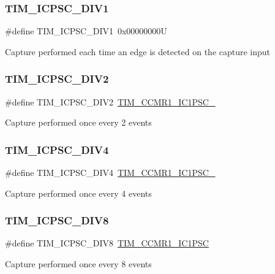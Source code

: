 \subsubsection{\texorpdfstring{TIM\_ICPSC\_DIV1}{TIM\_ICPSC\_DIV1}}
{\footnotesize\ttfamily \#define T\+I\+M\+\_\+\+I\+C\+P\+S\+C\+\_\+\+D\+I\+V1~0x00000000U}

Capture performed each time an edge is detected on the capture input \mbox{\label{group___t_i_m___input___capture___prescaler_ga1d8a7b66add914e2ddd910d2d700978f}} 
\subsubsection{\texorpdfstring{TIM\_ICPSC\_DIV2}{TIM\_ICPSC\_DIV2}}
{\footnotesize\ttfamily \#define T\+I\+M\+\_\+\+I\+C\+P\+S\+C\+\_\+\+D\+I\+V2~\mbox{\hyperlink{group___peripheral___registers___bits___definition_ga05673358a44aeaa56daefca67341b29d}{T\+I\+M\+\_\+\+C\+C\+M\+R1\+\_\+\+I\+C1\+P\+S\+C\+\_}}}

Capture performed once every 2 events \mbox{\label{group___t_i_m___input___capture___prescaler_gaf5a675046430fa0f0c95b0dac612828f}} 
\subsubsection{\texorpdfstring{TIM\_ICPSC\_DIV4}{TIM\_ICPSC\_DIV4}}
{\footnotesize\ttfamily \#define T\+I\+M\+\_\+\+I\+C\+P\+S\+C\+\_\+\+D\+I\+V4~\mbox{\hyperlink{group___peripheral___registers___bits___definition_gaf42b75da9b2f127dca98b6ca616f7add}{T\+I\+M\+\_\+\+C\+C\+M\+R1\+\_\+\+I\+C1\+P\+S\+C\+\_}}}

Capture performed once every 4 events \mbox{\label{group___t_i_m___input___capture___prescaler_ga5086cb03c89a5c67b199d20b605f00cb}} 
\subsubsection{\texorpdfstring{TIM\_ICPSC\_DIV8}{TIM\_ICPSC\_DIV8}}
{\footnotesize\ttfamily \#define T\+I\+M\+\_\+\+I\+C\+P\+S\+C\+\_\+\+D\+I\+V8~\mbox{\hyperlink{group___peripheral___registers___bits___definition_gab46b7186665f5308cd2ca52acfb63e72}{T\+I\+M\+\_\+\+C\+C\+M\+R1\+\_\+\+I\+C1\+P\+SC}}}

Capture performed once every 8 events 